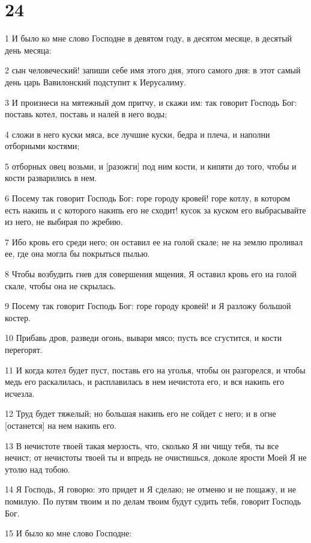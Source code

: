 \chapter{24}

\par 1 И было ко мне слово Господне в девятом году, в десятом месяце, в десятый день месяца:
\par 2 сын человеческий! запиши себе имя этого дня, этого самого дня: в этот самый день царь Вавилонский подступит к Иерусалиму.
\par 3 И произнеси на мятежный дом притчу, и скажи им: так говорит Господь Бог: поставь котел, поставь и налей в него воды;
\par 4 сложи в него куски мяса, все лучшие куски, бедра и плеча, и наполни отборными костями;
\par 5 отборных овец возьми, и [разожги] под ним кости, и кипяти до того, чтобы и кости разварились в нем.
\par 6 Посему так говорит Господь Бог: горе городу кровей! горе котлу, в котором есть накипь и с которого накипь его не сходит! кусок за куском его выбрасывайте из него, не выбирая по жребию.
\par 7 Ибо кровь его среди него; он оставил ее на голой скале; не на землю проливал ее, где она могла бы покрыться пылью.
\par 8 Чтобы возбудить гнев для совершения мщения, Я оставил кровь его на голой скале, чтобы она не скрылась.
\par 9 Посему так говорит Господь Бог: горе городу кровей! и Я разложу большой костер.
\par 10 Прибавь дров, разведи огонь, вывари мясо; пусть все сгустится, и кости перегорят.
\par 11 И когда котел будет пуст, поставь его на уголья, чтобы он разгорелся, и чтобы медь его раскалилась, и расплавилась в нем нечистота его, и вся накипь его исчезла.
\par 12 Труд будет тяжелый; но большая накипь его не сойдет с него; и в огне [останется] на нем накипь его.
\par 13 В нечистоте твоей такая мерзость, что, сколько Я ни чищу тебя, ты все нечист; от нечистоты твоей ты и впредь не очистишься, доколе ярости Моей Я не утолю над тобою.
\par 14 Я Господь, Я говорю: это придет и Я сделаю; не отменю и не пощажу, и не помилую. По путям твоим и по делам твоим будут судить тебя, говорит Господь Бог.
\par 15 И было ко мне слово Господне:
